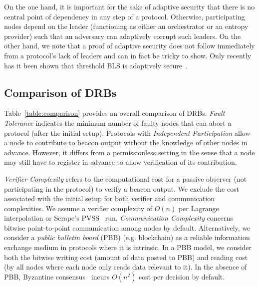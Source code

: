 On the one hand, it is important for the sake of adaptive security that there is no central point of dependency in any step of a protocol.
Otherwise, participating nodes depend on the leader (functioning as either an orchestrator or an entropy provider) such that an adversary can adaptively corrupt such leaders.
On the other hand, we note that a proof of adaptive security does not follow immediately from a protocol's lack of leaders and can in fact be tricky to show.
Only recently has it been shown that threshold BLS is adaptively secure~\cite{bacho2022adaptive}.

\subsection{Comparison of DRBs}
\label{subsection:comparison}
Table~\ref{table:comparison} provides an overall comparison of DRBs. \textit{Fault Tolerance} indicates the minimum number of faulty nodes that can abort a protocol (after the initial setup). Protocols with \textit{Independent Participation} allow a node to contribute to beacon output without the knowledge of other nodes in advance. However, it differs from a permissionless setting in the sense that a node may still have to register in advance to allow verification of its contribution.

\textit{Verifier Complexity} refers to the computational cost for a passive observer (not participating in the protocol) to verify a beacon output. We exclude the cost associated with the initial setup for both verifier and communication complexities. We assume a verifier complexity of $O(n)$ per Lagrange interpolation or Scrape's PVSS~\cite{cascudo2017scrape} run. \textit{Communication Complexity} concerns bitwise point-to-point communication among nodes by default. Alternatively, we consider a \textit{public bulletin board} (PBB) (e.g. blockchain) as a reliable information exchange medium in protocols where it is intrinsic. In a PBB model, we consider both the bitwise writing cost (amount of data posted to PBB) and reading cost (by all nodes where each node only reads data relevant to it). In the absence of PBB, Byzantine consensus~\cite{castro1999practical} incurs $O(n^2)$ cost per decision by default.


